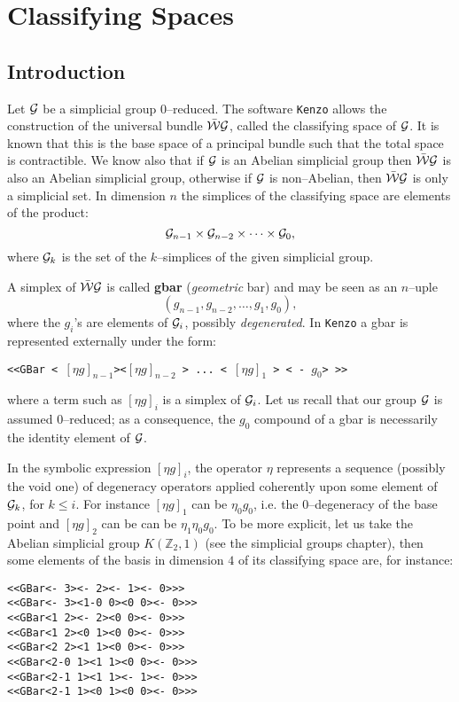 \chapter {Classifying Spaces}

\section {Introduction}

Let ${\cal G}$ be a simplicial group $0$--reduced. The software  {\tt Kenzo} allows
the construction of the universal bundle $\bar{\cal W}{\cal G}$, called the
classifying space of ${\cal G}$.
It is known that this is the base space of  a principal bundle
such that the total space is contractible. We know also that if ${\cal G}$ is
an Abelian simplicial group then $\bar{\cal W}{\cal G}$ is also an Abelian
simplicial group, otherwise if ${\cal G}$ is non--Abelian, then $\bar{\cal W}{\cal G}$
is only a simplicial set. In dimension $n$ the simplices of the
classifying space are elements of the  product:
$${\cal G}_{n-1}\times {\cal G}_{n-2}\times\cdots\times{\cal G}_0,$$
where ${\cal G}_k$ is the set of the $k$--simplices of the given simplicial group. \par
A simplex of $\bar{\cal W}{\cal G}$ is called {\bf gbar} ({\em geometric} bar)
and  may be seen as an $n$--uple
$$(g_{n-1}, g_{n-2}, \ldots, g_1, g_0),$$
where the $g_i$'s are elements of ${\cal G}_i$, possibly {\em degenerated}.
In {\tt Kenzo} a gbar is represented externally under the form:
\begin{center}
{\tt <<GBar < $[\eta g]_{n-1}$><$[\eta g]_{n-2}$ > ...  < $[\eta g]_1$ > < - $g_0$> >>}
\end{center}
where  a term such as $[\eta g]_i$ is a simplex of ${\cal G}_i$. Let us recall that
our group ${\cal G}$ is assumed $0$--reduced; as a consequence, the $g_0$ compound
of a gbar is necessarily the identity element of ${\cal G}$. \par
In the  symbolic expression $[\eta g]_i$,  the operator
$\eta$ represents a sequence (possibly the void one) of degeneracy operators
applied coherently upon some element of ${\cal G}_k$, for $k\leq i$. For instance $[\eta g]_1$
can be $\eta_0 g_0$, i.e. the $0$--degeneracy of the base point and $[\eta g]_2$ can be
can be $\eta_1\eta_0 g_0$. To be more explicit, let us take the Abelian simplicial group
$K(\mathbb{Z}_2, 1)$ (see the simplicial groups chapter), then some elements of the basis in dimension $4$ of
its classifying space are, for instance:
{\footnotesize\begin{verbatim}
<<GBar<- 3><- 2><- 1><- 0>>>
<<GBar<- 3><1-0 0><0 0><- 0>>>
<<GBar<1 2><- 2><0 0><- 0>>>
<<GBar<1 2><0 1><0 0><- 0>>>
<<GBar<2 2><1 1><0 0><- 0>>>
<<GBar<2-0 1><1 1><0 0><- 0>>>
<<GBar<2-1 1><1 1><- 1><- 0>>>
<<GBar<2-1 1><0 1><0 0><- 0>>>
\end{verbatim}}

